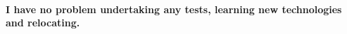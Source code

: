 \documentclass[11pt, a4paper]{awesome-cv} %
\begin{document}
\makecvheader %
\vspace{-0.5cm}
\paragraph{I have no problem undertaking any tests, learning new technologies and relocating.\\}
\bigskip
\noindent





\end{document}
